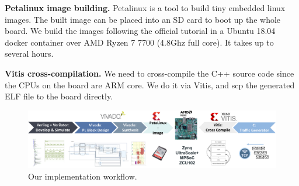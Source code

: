 \textbf{Petalinux image building.} Petalinux is a tool to build tiny embedded linux images.
The built image can be placed into an SD card to boot up the whole board. 
We build the images following the official tutorial in a Ubuntu 18.04 docker container over AMD Ryzen 7 7700 (4.8Ghz full core). It takes up to several hours.

\textbf{Vitis cross-compilation.} We need to cross-compile the C++ source code since the CPUs on the board are ARM core. We do it via Vitis, and scp the generated ELF file to the board directly.




\begin{figure}[ht]
    \centering
    \includegraphics[width=500pt]{images/implworkflow.pdf}
    \caption{Our implementation workflow. }
\end{figure}


